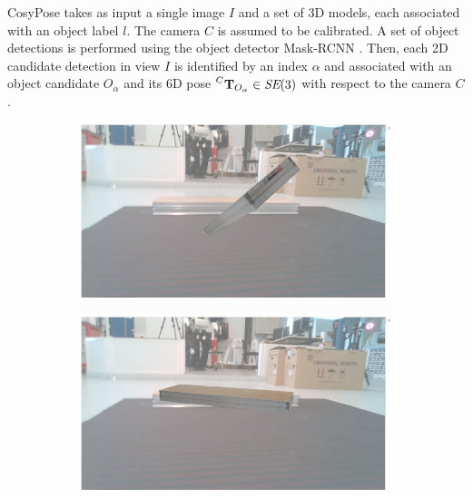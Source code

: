 CosyPose takes as input a single image $I$ and a set of 3D models, each associated with an object label $l$. The camera $C$ is assumed to be calibrated. 
A set of object detections is performed using the object detector Mask-RCNN \cite{he2018mask}. Then, each 2D candidate detection in view $I$ is identified 
by an index $\alpha$ and associated with an object candidate $O_{\alpha}$ and its 6D pose $\prescript{C}{}{{\bf T}}_{O_{\alpha}} \in \textit{SE} (3)$ with respect to the camera $C$.

\begin{figure}[]

    \begin{subfigure}{.5\textwidth} %
        \centering
        \includegraphics[width=.9\linewidth]{figures/convergence_1.png}  %
    \end{subfigure}
    \begin{subfigure}{.5\textwidth}
        \centering
        \includegraphics[width=.9\linewidth]{figures/convergence_2.png}  
    \end{subfigure}


\end{figure}
